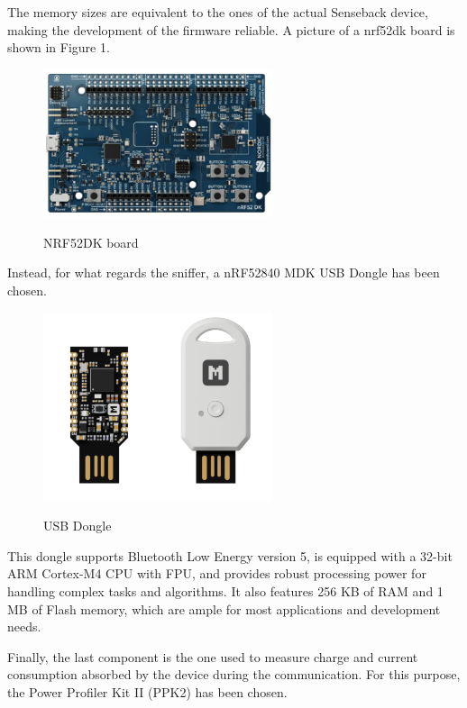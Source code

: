 \documentclass{Configuration_Files/PoliMi3i_thesis}
\begin{document}
The memory sizes are equivalent to the ones of the actual Senseback device, making the development of the firmware reliable. A picture of a nrf52dk board is shown in Figure 1.

\begin{figure}[H]
    \centering
    \includegraphics[width=0.6\textwidth]{Materials/figure2}
    \label{materials_2}
    \caption{NRF52DK board}
\end{figure}

Instead, for what regards the sniffer, a nRF52840 MDK USB Dongle has been chosen.

\begin{figure}[H]
    \centering
    \includegraphics[width=0.6\textwidth]{Materials/figure3}
    \label{materials_3}
    \caption{USB Dongle}
\end{figure}

This dongle supports Bluetooth Low Energy version 5, is equipped with a 32-bit ARM Cortex-M4 CPU with FPU, and provides robust processing power for handling complex tasks and algorithms. It also features 256 KB of RAM and 1 MB of Flash memory, which are ample for most applications and development needs.

Finally, the last component is the one used to measure charge and current consumption absorbed by the device during the communication. For this purpose, the Power Profiler Kit II (PPK2) has been chosen.
\end{document}
